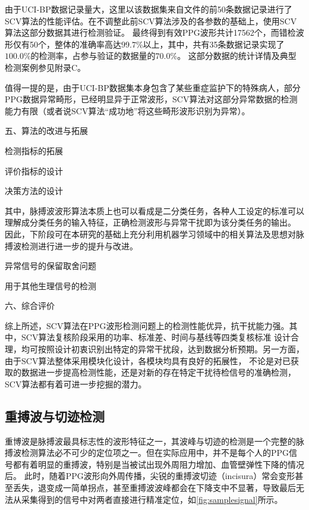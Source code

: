由于UCI-BP数据记录量大，这里以该数据集来自文件的前50条数据记录进行了SCV算法的性能评估。在不调整此前SCV算法涉及的各参数的基础上，使用SCV算法这部分数据其进行检测验证。
最终得到有效PPG波形共计17562个，而错检波形仅有50个，整体的准确率高达$99.7\%$以上，其中，共有35条数据记录实现了$100.0\%$的检测率，占参与验证的数据量的$70.0\%$。
这部分数据的统计详情及典型检测案例参见附录C。

值得一提的是，由于UCI-BP数据集本身包含了某些重症监护下的特殊病人，部分PPG数据异常畸形，已经明显异于正常波形，SCV算法对这部分异常数据的检测能力有限（或者说SCV算法“成功地”将这些畸形波形识别为异常）。


五、算法的改进与拓展

检测指标的拓展

评价指标的设计

决策方法的设计

其中，脉搏波波形算法本质上也可以看成是二分类任务，各种人工设定的标准可以理解成分类任务的输入特征，正确检测波形与异常干扰即为该分类任务的输出。
因此，下阶段可在本研究的基础上充分利用机器学习领域中的相关算法及思想对脉搏波检测进行进一步的提升与改进。

异常信号的保留取舍问题

用于其他生理信号的检测

六、综合评价

综上所述，SCV算法在PPG波形检测问题上的检测性能优异，抗干扰能力强。其中，SCV算法复核阶段采用的功率、标准差、时间与基线等四类复核标准
设计合理，均可按照设计初衷识别出特定的异常干扰段，达到数据分析预期。另一方面，由于SCV算法整体采用模块化设计，各模块均具有良好的拓展性，
不论是对已获取的数据进一步提高检测性能，还是对新的存在特定干扰待检信号的准确检测，SCV算法都有着可进一步挖掘的潜力。

\subsection{重搏波与切迹检测}
重博波是脉搏波最具标志性的波形特征之一，其波峰与切迹的检测是一个完整的脉搏波检测算法必不可少的定位项之一\cite{Wang2012}。但在实际应用中，并不是每个人的PPG信号都有着明显的重搏波，特别是当被试出现外周阻力增加、血管壁弹性下降的情况后\cite{mmt}。
此时，随着PPG波形向外周传播，尖锐的重搏波切迹（incisura）常会变形甚至丢失，退变成一简单拐点，甚至重搏波波峰都会在下降支中不显著，导致最后无法从采集得到的信号中对两者直接进行精准定位，如\autoref{fig:samplesignal}所示。

